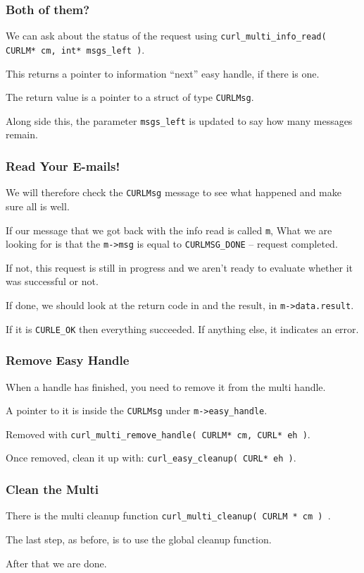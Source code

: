 \begin{frame}
	\frametitle{Both of them?}
	We can ask about the status of the request using \texttt{curl\_multi\_info\_read( CURLM* cm, int* msgs\_left )}.

	This returns a pointer to information ``next'' easy handle, if there is one.

	The return value is a pointer to a struct of type \texttt{CURLMsg}.

	Along side this, the parameter \texttt{msgs\_left} is updated to say how many messages remain.

\end{frame}

\begin{frame}
	\frametitle{Read Your E-mails!}

	We will therefore check the \texttt{CURLMsg} message to see what happened and make sure all is well.

	If our message that we got back with the info read is called \texttt{m}, What we are looking for is that the \texttt{m->msg} is equal to \texttt{CURLMSG\_DONE} -- request completed.

	If not, this request is still in progress and we aren't ready to evaluate whether it was successful or not.

	If done, we should look at the return code in and the result, in \texttt{m->data.result}.

	If it is \texttt{CURLE\_OK} then everything succeeded. If anything else, it indicates an error.


\end{frame}

\begin{frame}
	\frametitle{Remove Easy Handle}

	When a handle has finished, you need to remove it from the multi handle.

	A pointer to it is inside the \texttt{CURLMsg} under \texttt{m->easy\_handle}.

	Removed with \texttt{curl\_multi\_remove\_handle( CURLM* cm, CURL* eh )}.

	Once removed, clean it up with: \texttt{curl\_easy\_cleanup( CURL* eh )}.


\end{frame}

\begin{frame}
	\frametitle{Clean the Multi}

	There is the multi cleanup function \texttt{curl\_multi\_cleanup( CURLM * cm ) }.

	The last step, as before, is to use the global cleanup function.

	After that we are done.


\end{frame}

